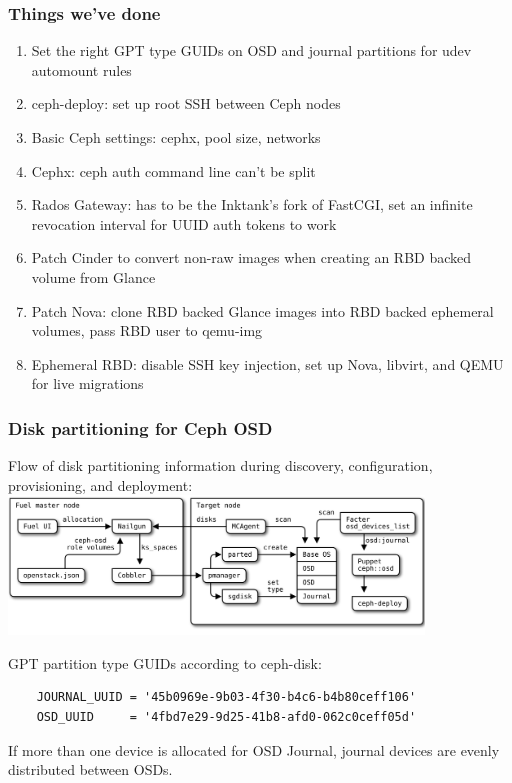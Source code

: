 \documentclass[hyperref=unicode,utf8,xcolor=pst]{beamer}
\begin{document}
\begin{frame}
	\frametitle{Things we've done}
	\begin{enumerate}
		\item Set the right GPT type GUIDs on OSD and journal
			partitions for udev automount rules
		\item ceph-deploy: set up root SSH between Ceph nodes
		\item Basic Ceph settings: cephx, pool size, networks
		\item Cephx: ceph auth command line can't be split
		\item Rados Gateway: has to be the Inktank's fork of
			FastCGI, set an infinite revocation interval for
			UUID auth tokens to work
		\item Patch Cinder to convert non-raw images when
			creating an RBD backed volume from Glance
		\item Patch Nova: clone RBD backed Glance images into
			RBD backed ephemeral volumes, pass RBD user to
			qemu-img
		\item Ephemeral RBD: disable SSH key injection, set up
			Nova, libvirt, and QEMU for live migrations
	\end{enumerate}
\end{frame}

\begin{frame}[fragile]
	\frametitle{Disk partitioning for Ceph OSD}
	Flow of disk partitioning information during discovery,
	configuration, provisioning, and deployment:\\
	\vspace{1ex}
	\includegraphics[height=3.7cm]{osd-disks}

	GPT partition type GUIDs according to ceph-disk:
	\begin{lstlisting}
	JOURNAL_UUID = '45b0969e-9b03-4f30-b4c6-b4b80ceff106'
	OSD_UUID     = '4fbd7e29-9d25-41b8-afd0-062c0ceff05d'
	\end{lstlisting}

	\vspace{1ex}
	If more than one device is allocated for OSD Journal, journal
	devices are evenly distributed between OSDs.
\end{frame}
\end{document}
